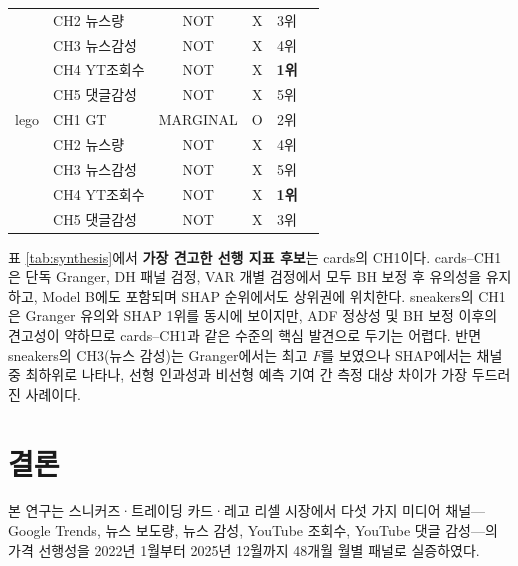 \documentclass[11pt, a4paper, twocolumn]{article}
\begin{document}
\begin{table}[!tbp]
\begin{tabular}{llcccc}
         & CH2 뉴스량   & NOT          & X & 3위          & \\
         & CH3 뉴스감성 & NOT          & X & 4위          & \\
         & CH4 YT조회수 & NOT          & X & \textbf{1위} & \\
         & CH5 댓글감성 & NOT          & X & 5위          & \\
\midrule
lego     & CH1 GT      & MARGINAL     & O & 2위          &  \\
         & CH2 뉴스량   & NOT          & X & 4위          & \\
         & CH3 뉴스감성 & NOT          & X & 5위          & \\
         & CH4 YT조회수 & NOT          & X & \textbf{1위} & \\
         & CH5 댓글감성 & NOT          & X & 3위          & \\
\bottomrule
\end{tabular}
\end{table}

표 \ref{tab:synthesis}에서 \textbf{가장 견고한 선행 지표 후보}는
cards의 CH1이다. cards--CH1은 단독 Granger, DH 패널 검정, VAR 개별
검정에서 모두 BH 보정 후 유의성을 유지하고, Model B에도 포함되며 SHAP
순위에서도 상위권에 위치한다. sneakers의 CH1은 Granger 유의와 SHAP 1위를
동시에 보이지만, ADF 정상성 및 BH 보정 이후의 견고성이 약하므로 cards--CH1과
같은 수준의 핵심 발견으로 두기는 어렵다. 반면 sneakers의 CH3(뉴스 감성)는
Granger에서는 최고 $F$를 보였으나 SHAP에서는 채널 중 최하위로 나타나,
선형 인과성과 비선형 예측 기여 간 측정 대상 차이가 가장 두드러진 사례이다.

\section{결론}\label{sec:conclusion}

본 연구는 스니커즈·트레이딩 카드·레고 리셀 시장에서 다섯 가지 미디어
채널---Google Trends, 뉴스 보도량, 뉴스 감성, YouTube 조회수, YouTube
댓글 감성---의 가격 선행성을 2022년 1월부터 2025년 12월까지 48개월
월별 패널로 실증하였다.
\end{document}
